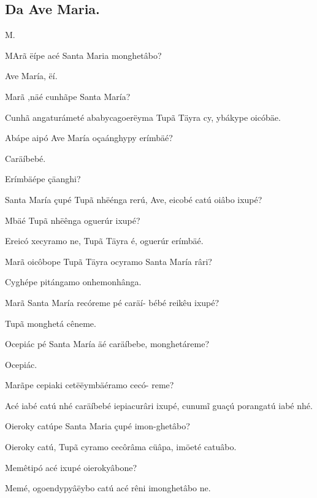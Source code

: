 \documentclass[openany,titlepage,12pt]{book}
\renewcommand{\chaptermark}[1]{\markboth{#1}{}}
\renewcommand{\sectionmark}[1]{\gdef\rightmark{#1}}
\newcommand{\lgSS}{\char"017F\char"017F}
\newcommand{\comecalista}[5]{
    \hspace*{-11.7pt}
    \begin{minipage}[t]{0.08\linewidth}
        \flushright #1\\#2
    \end{minipage}
    \hspace{0pt}
    \begin{minipage}[t]{0.94\linewidth}
        \lettrine
        [findent =2pt, nindent=0pt,  lines=2]
        {#3}{#4}#5
    \end{minipage}
    \vspace*{-3pt}
}
\begin{document}
\subsection{Da Ave Maria.}

\chaptermark{Dialogo V.}
\sectionmark{Do Padre No\lgSS o.}
\vspace*{2pt}
\comecalista{M.}{}{M}{A}
    {rã ëípe acé Santa Maria monghetâbo?}
\begin{altereven}
    \item Ave María, ëí.
    \item Marã ,näé cunhãpe Santa María?
    \item Cunhã angaturámeté ababycagoerëyma Tupã Täyra cy,
    ybákype oicóbäe.
    \item Abápe aipó Ave María oçaánghypy erímbäé?
    \item Caräíbebé.
    \item Erímbäépe çäanghi?
    \item Santa María çupé Tupã nhëénga rerú,\linebreak
    Ave, eicobé catú oiâbo ixupé? 
    \item Mbäé Tupã nhëênga oguerúr ixupé?
    \item Ereicó xecyramo ne, Tupã Täyra é, 
    oguerúr erímbäé.
    \item Marã oicôbope Tupã Täyra ocyramo \linebreak
    Santa María râri?
    \item Cyghépe pitángamo onhemonhânga.
    \item Marã Santa María recóreme pé caräí-\linebreak
    bébé reikêu ixupé?
    \item Tupã monghetá cêneme.
    \item Ocepiác pé Santa María äé caräíbebe,\linebreak
    monghetáreme?
    \item Ocepiác.
    \item Marãpe cepiaki cetëëymbäéramo cecó-\linebreak
    reme?
    \item Acé iabé catú nhé caräíbebé iepiacurâri ixupé,
    cunumĩ guaçú porangatú iabé nhé.
    \item Oieroky catúpe Santa Maria çupé imon-ghetâbo?
    \item Oieroky catú, Tupã cyramo cecôrâma\linebreak
    cüâpa, imöeté catuâbo. 
    \item Memêtipó acé ixupé oierokyâbone?
    \item Memé, ogoendypyâëybo catú acé rêni\linebreak
    imonghetâbo ne.
\end{altereven}
\sectionmark{Da Ave Maria.}
\newpage
\end{document}
